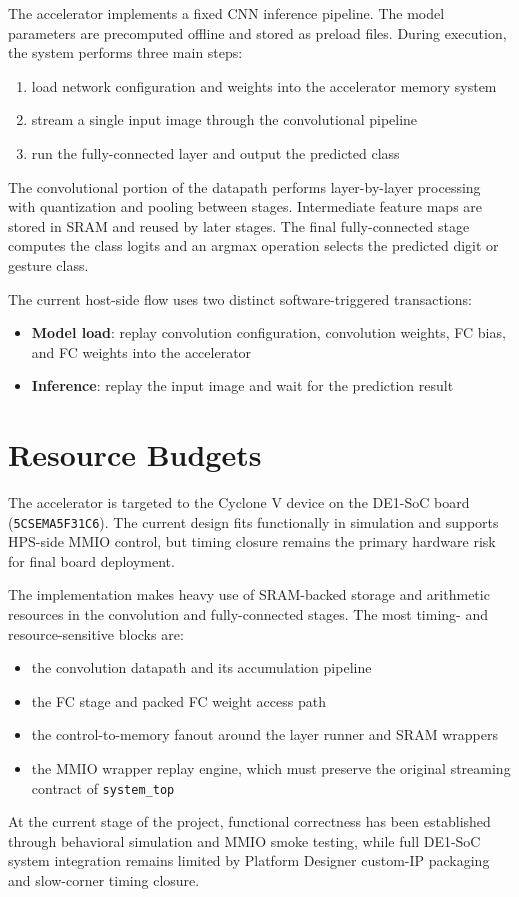 \documentclass[11pt]{article}
\begin{document}
The accelerator implements a fixed CNN inference pipeline. The model parameters
are precomputed offline and stored as preload files. During execution, the
system performs three main steps:
\begin{enumerate}
\item load network configuration and weights into the accelerator memory system
\item stream a single input image through the convolutional pipeline
\item run the fully-connected layer and output the predicted class
\end{enumerate}

The convolutional portion of the datapath performs layer-by-layer processing
with quantization and pooling between stages. Intermediate feature maps are
stored in SRAM and reused by later stages. The final fully-connected stage
computes the class logits and an argmax operation selects the predicted digit or
gesture class.

The current host-side flow uses two distinct software-triggered transactions:
\begin{itemize}
\item \textbf{Model load}: replay convolution configuration, convolution
weights, FC bias, and FC weights into the accelerator
\item \textbf{Inference}: replay the input image and wait for the prediction
result
\end{itemize}



\section{Resource Budgets}

The accelerator is targeted to the Cyclone V device on the DE1-SoC board
(\texttt{5CSEMA5F31C6}). The current design fits functionally in simulation and
supports HPS-side MMIO control, but timing closure remains the primary hardware
risk for final board deployment.

The implementation makes heavy use of SRAM-backed storage and arithmetic
resources in the convolution and fully-connected stages. The most timing- and
resource-sensitive blocks are:
\begin{itemize}
\item the convolution datapath and its accumulation pipeline
\item the FC stage and packed FC weight access path
\item the control-to-memory fanout around the layer runner and SRAM wrappers
\item the MMIO wrapper replay engine, which must preserve the original
streaming contract of \texttt{system\_top}
\end{itemize}

At the current stage of the project, functional correctness has been established
through behavioral simulation and MMIO smoke testing, while full DE1-SoC system
integration remains limited by Platform Designer custom-IP packaging and
slow-corner timing closure.
\end{document}
